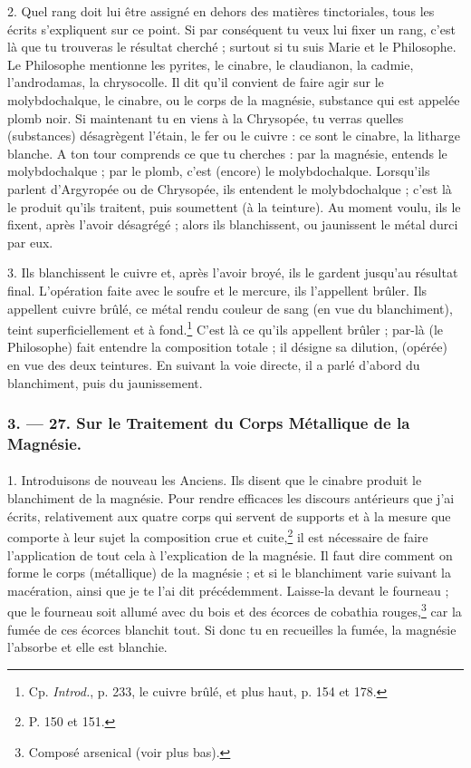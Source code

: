 \documentclass[a4paper, 11pt, oneside, polutonikogreek, french]{article}
\begin{document}
2. Quel rang doit lui être assigné en dehors des matières tinctoriales, tous les écrits s'expliquent sur ce point. Si par conséquent tu veux lui fixer un rang, c'est là que tu trouveras le résultat cherché ; surtout si tu suis Marie et le Philosophe. Le Philosophe mentionne les pyrites, le cinabre, le claudianon, la cadmie, l'androdamas, la chrysocolle. Il dit qu'il convient de faire agir sur le molybdochalque, le cinabre, ou le corps de la magnésie, substance qui est appelée plomb noir. Si maintenant tu en viens à la Chrysopée, tu verras quelles (substances) désagrègent l'étain, le fer ou le cuivre : ce sont le cinabre, la litharge blanche. A ton tour comprends ce que tu cherches : par la magnésie, entends le molybdochalque ; par le plomb, c'est (encore) le molybdochalque. Lorsqu'ils parlent d'Argyropée ou de Chrysopée, ils entendent le molybdochalque ; c'est là le produit qu'ils traitent, puis soumettent (à la teinture). Au moment voulu, ils le fixent, après l'avoir désagrégé ; alors ils blanchissent, ou jaunissent le métal durci par eux.

3. Ils blanchissent le cuivre et, après l'avoir broyé, ils le gardent jusqu'au résultat final. L'opération faite avec le soufre et le mercure, ils l'appellent brûler. Ils appellent cuivre brûlé, ce métal rendu couleur de sang (en vue du blanchiment), teint superficiellement et à fond.\footnote{Cp. \emph{Introd.}, p. 233, le cuivre brûlé, et plus haut, p. 154 et 178.} C'est là ce qu'ils appellent brûler ; par-là (le Philosophe) fait entendre la composition totale ; il désigne sa dilution, (opérée) en vue des deux teintures. En suivant la voie directe, il a parlé d'abord du blanchiment, puis du jaunissement.

\bigskip
\centerline{\EightStarTaper}
\centerline{\EightStarTaper\EightStarTaper}
\bigskip

\subsubsection{3. --- 27. Sur le Traitement du Corps Métallique de la Magnésie.}
\paragraph{}
1. Introduisons de nouveau les Anciens. Ils disent que le cinabre produit le blanchiment de la magnésie. Pour rendre efficaces les discours antérieurs que j'ai écrits, relativement aux quatre corps qui servent de supports et à la mesure que comporte à leur sujet la composition crue et cuite,\footnote{P. 150 et 151.} il est nécessaire de faire l'application de tout cela à l'explication de la magnésie. Il faut dire comment on forme le corps (métallique) de la magnésie ; et si le blanchiment varie suivant la macération, ainsi que je te l'ai dit précédemment. Laisse-la devant le fourneau ; que le fourneau soit allumé avec du bois et des écorces de cobathia rouges,\footnote{Composé arsenical (voir plus bas).} car la fumée de ces écorces blanchit tout. Si donc tu en recueilles la fumée, la magnésie l'absorbe et elle est blanchie.
\end{document}
